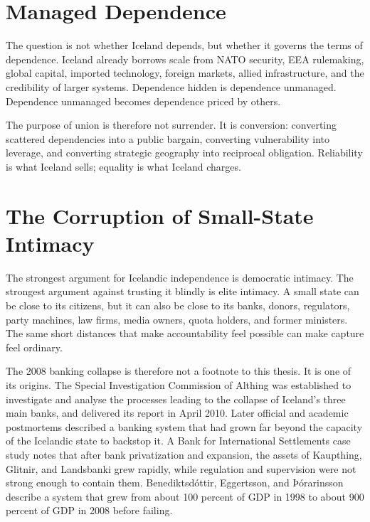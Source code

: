 \documentclass[11pt,a4paper]{article}
\begin{document}
\section{Managed Dependence}
The question is not whether Iceland depends, but whether it governs the terms of dependence. Iceland already borrows scale from NATO security, EEA rulemaking, global capital, imported technology, foreign markets, allied infrastructure, and the credibility of larger systems. Dependence hidden is dependence unmanaged. Dependence unmanaged becomes dependence priced by others.

The purpose of union is therefore not surrender. It is conversion: converting scattered dependencies into a public bargain, converting vulnerability into leverage, and converting strategic geography into reciprocal obligation. Reliability is what Iceland sells; equality is what Iceland charges.

\section{The Corruption of Small-State Intimacy}
The strongest argument for Icelandic independence is democratic intimacy. The strongest argument against trusting it blindly is elite intimacy. A small state can be close to its citizens, but it can also be close to its banks, donors, regulators, party machines, law firms, media owners, quota holders, and former ministers. The same short distances that make accountability feel possible can make capture feel ordinary.

The 2008 banking collapse is therefore not a footnote to this thesis. It is one of its origins. The Special Investigation Commission of Althing was established to investigate and analyse the processes leading to the collapse of Iceland's three main banks, and delivered its report in April 2010.\cite{sicenglish} Later official and academic postmortems described a banking system that had grown far beyond the capacity of the Icelandic state to backstop it. A Bank for International Settlements case study notes that after bank privatization and expansion, the assets of Kaupthing, Glitnir, and Landsbanki grew rapidly, while regulation and supervision were not strong enough to contain them.\cite{bisiceland} Benediktsdóttir, Eggertsson, and Þórarinsson describe a system that grew from about 100 percent of GDP in 1998 to about 900 percent of GDP in 2008 before failing.\cite{brookingsiceland}
\end{document}
